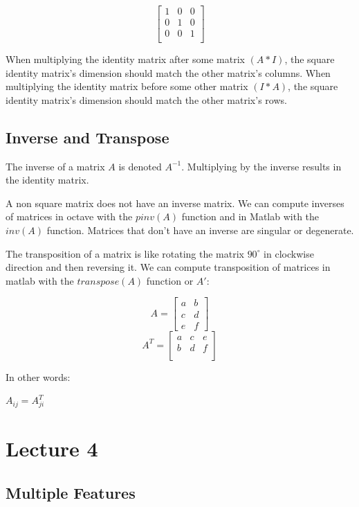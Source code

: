 \documentclass[UTF8]{article}
\begin{document}
\[ \begin{bmatrix} 1 & 0 & 0 \\ 0 & 1 & 0 \\ 0 & 0 & 1 \\ \end{bmatrix} \]

When multiplying the identity matrix after some matrix $(A*I)$, the square identity matrix's dimension should match the other matrix's columns. When multiplying the identity matrix before some other matrix $(I*A)$, the square identity matrix's dimension should match the other matrix's rows.

\subsection{Inverse and Transpose}

The inverse of a matrix $A$ is denoted $A^{-1}$. Multiplying by the inverse results in the identity matrix.

A non square matrix does not have an inverse matrix. We can compute inverses of matrices in octave with the $pinv(A)$ function and in Matlab with the $inv(A)$ function. Matrices that don't have an inverse are singular or degenerate.

The transposition of a matrix is like rotating the matrix $90^{\circ}$ in clockwise direction and then reversing it. We can compute transposition of matrices in matlab with the $transpose(A)$ function or $A'$:

\[ A = \begin{bmatrix} a & b \\ c & d \\ e & f \end{bmatrix} \]
\[ A^T = \begin{bmatrix} a & c & e \\ b & d & f \\ \end{bmatrix} \]

In other words:

$A_{ij}=A^T_{ji}$

\section{Lecture 4}

\subsection{Multiple Features}
\end{document}

